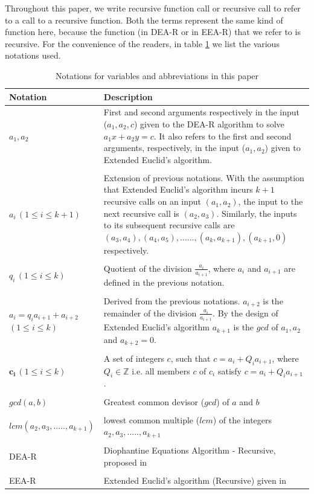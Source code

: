 \documentclass[pdflatex,sn-mathphys-num]{sn-jnl}%
\theoremstyle{thmstyleone}%
\theoremstyle{thmstyletwo}%
\theoremstyle{thmstylethree}%
\begin{document}
 Throughout this paper, we write recursive function call or recursive call to refer to a call to a recursive function. Both the terms represent the same kind of function here, because the function (in DEA-R or in EEA-R) that we refer to is recursive. For the convenience of the readers, in table \ref{tab:my_label} we list the various notations used.
\begin{table}[h]
\caption{Notations for variables and abbreviations in this paper}
    \centering

    \begin{tabular}{p{4cm}|p{7.6cm}}
         \textbf{Notation} &  \textbf{Description} \\\hline
         $a_1,a_2$ & First and second arguments respectively in the input ($a_1,a_2,c$) given to the DEA-R algorithm to solve $a_1x+a_2y=c$. It also refers to the first and second arguments, respectively, in the input ($a_1,a_2$) given to Extended Euclid's algorithm. \\\\
         $a_i\,  (1\le i \le k+1)$ & Extension of previous notations. With the assumption that Extended Euclid's algorithm incurs $k+1$ recursive calls on an input $(a_1,a_2)$, the input to the next recursive call is $(a_2,a_3)$. Similarly, the inputs to its subsequent recursive calls are $(a_3,a_4),(a_4,a_5),......,(a_k,a_{k+1}),(a_{k+1},0)$ respectively.
    \\\\ $q_i\,  (1\le i \le k)$ & Quotient of the division $\frac{a_i}{a_{i+1}}$, where $a_i$ and $a_{i+1}$ are defined in the previous notation.
    \\\\$a_i=q_ia_{i+1}+a_{i+2}\,$ $ (1\le i \le k)$ & Derived from the previous notations. $a_{i+2}$ is the remainder of the division $\frac{a_i}{a_{i+1}}$. By the design of Extended Euclid's algorithm $a_{k+1}$ is the $gcd$ of $a_1,a_2$ and $a_{k+2}=0$. \\\\
    $\mathbf{c_i}\,  (1\le i \le k)$ & A set of integers $c$, such that $c=a_i+Q_ia_{i+1}$, where $Q_i \in \mathbb{Z}$ i.e. all members $c$ of $c_i$ satisfy $c=a_i+Q_ia_{i+1}$. 
    \\\\
    $gcd(a,b)$ & Greatest common devisor ($gcd$) of $a$ and $b$ 
    \\\\ 
    $lcm(a_2,a_3,.....,a_{k+1})$ & lowest common multiple ($lcm$) of the integers $a_2,a_3,.....,a_{k+1}$\\\\
    
DEA-R & Diophantine Equations Algorithm - Recursive, proposed in \cite{deora2023algorithm}\\\\
EEA-R & Extended Euclid's algorithm (Recursive) given in \cite{cormen2009introduction}
\\\hline
 \end{tabular}
    
    \label{tab:my_label}
\end{table}
 
\end{document}
